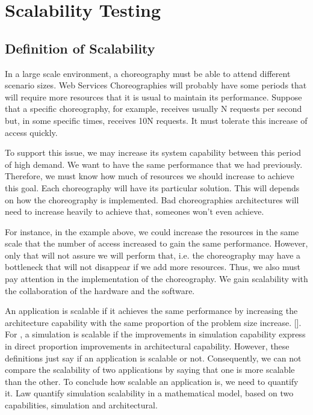 \section{Scalability Testing}

\subsection{Definition of Scalability}
In a large scale environment, a choreography must be able to attend different scenario sizes. Web Services Choreographies will probably have some periods that will require more resources that it is usual to maintain its performance.  Suppose that a specific choreography, for example, receives usually N requests per second but, in some specific times, receives 10N requests. It must tolerate this increase of access quickly.

To support this issue, we may increase its system capability between this period of high demand. We want to have the same performance that we had previously. Therefore, we must know how much of resources we should increase to achieve this goal.  Each choreography will have its particular solution. This will depends on how the choreography is implemented. Bad choreographies architectures will need to increase heavily to achieve that, someones won't even achieve.

For instance, in the example above, we could increase the resources in the same scale that the number of access increased to gain the same performance. However, only that will not assure we will perform that, i.e.  the choreography may have a bottleneck that will not disappear if we add more resources. Thus, we also must pay attention in the implementation of the choreography. We gain scalability with the collaboration of the hardware and the software. 

An application is scalable if it achieves the same performance by increasing the architecture capability with the same proportion of the problem size increase. [\citet{QUINN}]. For \citet{LAW}, a simulation is scalable if the improvements in simulation capability express in direct proportion improvements in architectural capability. However, these definitions just say if an application is scalable or not. Consequently, we can not compare the scalability of two applications by saying that one is more scalable than the other. To conclude how scalable an application is, we need to quantify it. Law quantify simulation scalability in a mathematical model, based on two capabilities, simulation and architectural. 

